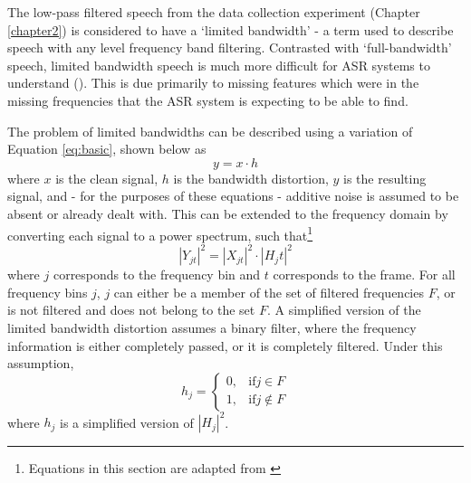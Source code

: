 The low-pass filtered speech from the data collection experiment (Chapter \ref{chapter2}) is considered to have a `limited bandwidth' - a term used to describe speech with any level frequency band filtering.  Contrasted with `full-bandwidth' speech, limited bandwidth speech is much more difficult for ASR systems to understand (\cite{morales:09}). This is due primarily to missing features which were in the missing frequencies that the ASR system is expecting to be able to find.

The problem of limited bandwidths can be described using a variation of Equation \ref{eq:basic}, shown below as \begin{equation} y = x \cdot h \end{equation} where $x$ is the clean signal, $h$ is the bandwidth distortion, $y$ is the resulting signal, and - for the purposes of these equations - additive noise is assumed to be absent or already dealt with.  This can be extended to the frequency domain by converting each signal to a power spectrum, such that\footnote{Equations in this section are adapted from \cite{morales:09}} \begin{equation} |Y_{jt}|^2 = |X_{jt}|^2 \cdot |H_jt|^2 \end{equation} where $j$ corresponds to the frequency bin and $t$ corresponds to the frame.  For all frequency bins $j$, $j$ can either be a member of the set of filtered frequencies $F$, or is not filtered and does not belong to the set $F$.  A simplified version of the limited bandwidth distortion assumes a binary filter, where the frequency information is either completely passed, or it is completely filtered.  Under this assumption, \[ h_j= \begin{cases} 0,& \text{if} j \in F \\ 1,& \text{if} j \notin F \end{cases} \] where $h_j$ is a simplified version of $|H_j|^2$.


